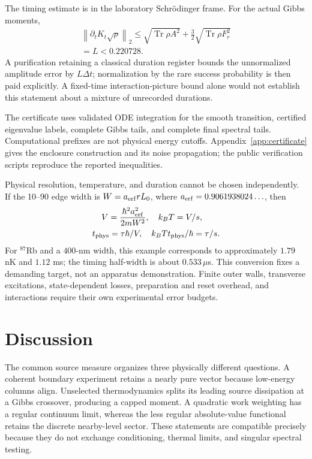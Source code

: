 \documentclass[aps,pra,reprint,superscriptaddress,longbibliography]{revtex4-2}
\newcommand{\Tr}{\operatorname{Tr}}
\newcommand{\norm}[1]{\left\lVert#1\right\rVert}
\begin{document}
The timing estimate is in the laboratory Schr\"odinger frame.
For the actual Gibbs moments,
\begin{equation}
 \begin{gathered}
 \norm{\partial_t K_t\sqrt\rho}_2
 \le\sqrt{\Tr\rho A^2}+\frac32\sqrt{\Tr\rho F_r^2}
 \\=L<0.220728.                                                \label{eq:jitter}
 \end{gathered}
\end{equation}
A purification retaining a classical duration register bounds the
unnormalized amplitude error by $L\Delta t$; normalization by the
rare success probability is then paid explicitly. A fixed-time
interaction-picture bound alone would not establish this statement
about a mixture of unrecorded durations.

The certificate uses validated ODE integration for the smooth
transition, certified eigenvalue labels, complete Gibbs tails, and
complete final spectral tails. Computational prefixes are not
physical energy cutoffs. Appendix~\ref{app:certificate} gives the
enclosure construction and its noise propagation; the public
verification scripts reproduce the reported inequalities.

Physical resolution, temperature, and duration cannot be chosen
independently. If the 10--90 edge width is $W=a_{\rm erf}rL_0$,
where $a_{\rm erf}=0.9061938024\ldots$, then
\begin{equation}
 \begin{gathered}
 V=\frac{\hbar^2a_{\rm erf}^2}{2mW^2},\quad
 k_BT=V/s,\quad\\ t_{\rm phys}=\tau\hbar/V,\quad
 k_BTt_{\rm phys}/\hbar=\tau/s.                              \label{eq:tradeoff}
 \end{gathered}
\end{equation}
For $^{87}$Rb and a $400$-nm width, this example corresponds to
approximately $1.79$ nK and $1.12$ ms; the timing half-width is
about $0.533\,\mu$s. This conversion fixes a demanding target,
not an apparatus demonstration. Finite outer walls, transverse
excitations, state-dependent losses, preparation and reset overhead,
and interactions require their own experimental error budgets.

\section{Discussion}

The common source measure organizes three physically different
questions. A coherent boundary experiment retains a nearly pure
vector because low-energy columns align. Unselected thermodynamics
splits its leading source dissipation at a Gibbs crossover, producing
a capped moment. A quadratic work weighting has a regular continuum
limit, whereas the less regular absolute-value functional retains
the discrete nearby-level sector. These statements are compatible
precisely because they do not exchange conditioning, thermal limits,
and singular spectral testing.
\end{document}
